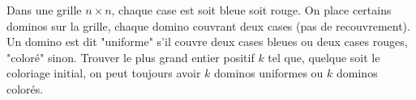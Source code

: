 Dans une grille $n\times n$, chaque case est soit bleue soit rouge. On place certains dominos sur la grille, chaque domino couvrant deux cases (pas de recouvrement). Un domino est dit "uniforme" s'il couvre deux cases bleues ou deux cases rouges, "coloré" sinon. Trouver le plus grand entier positif $k$ tel que, quelque soit le coloriage initial, on peut toujours avoir $k$ dominos uniformes ou $k$ dominos colorés.